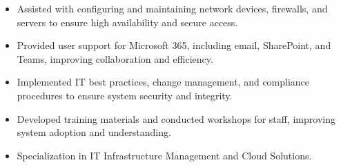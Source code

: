 \par\smallskip
\noindent
\begin{minipage}{20cm}
  \begin{minipage}{9.75cm}
    \begin{itemize}
      \item Assisted with configuring and maintaining network devices, firewalls, and servers to ensure high availability and secure access.
      \item Provided user support for Microsoft 365, including email, SharePoint, and Teams, improving collaboration and efficiency.
    \end{itemize}
  \end{minipage}
  \hfill
  \begin{minipage}{9.75cm}
    \begin{itemize}
      \item Implemented IT best practices, change management, and compliance procedures to ensure system security and integrity.
      \item Developed training materials and conducted workshops for staff, improving system adoption and understanding.
    \end{itemize}
  \end{minipage}
\end{minipage}

\begin{itemize}
  \item Specialization in IT Infrastructure Management and Cloud Solutions.
\end{itemize}


\noindent
\begin{minipage}{20cm}
\end{minipage}


